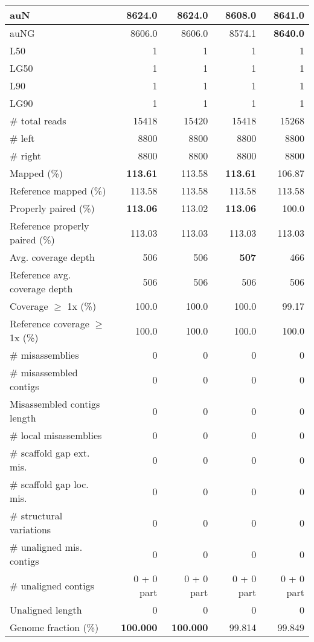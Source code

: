 \documentclass[12pt,a4paper]{article}
\begin{document}
\begin{table}[ht]
\begin{center}
\begin{tabular}{|l*{4}{|r}|}
auN & 8624.0 & 8624.0 & 8608.0 & {\bf 8641.0} \\ \hline
auNG & 8606.0 & 8606.0 & 8574.1 & {\bf 8640.0} \\ \hline
L50 & 1 & 1 & 1 & 1 \\ \hline
LG50 & 1 & 1 & 1 & 1 \\ \hline
L90 & 1 & 1 & 1 & 1 \\ \hline
LG90 & 1 & 1 & 1 & 1 \\ \hline
\# total reads & 15418 & 15420 & 15418 & 15268 \\ \hline
\# left & 8800 & 8800 & 8800 & 8800 \\ \hline
\# right & 8800 & 8800 & 8800 & 8800 \\ \hline
Mapped (\%) & {\bf 113.61} & 113.58 & {\bf 113.61} & 106.87 \\ \hline
Reference mapped (\%) & 113.58 & 113.58 & 113.58 & 113.58 \\ \hline
Properly paired (\%) & {\bf 113.06} & 113.02 & {\bf 113.06} & 100.0 \\ \hline
Reference properly paired (\%) & 113.03 & 113.03 & 113.03 & 113.03 \\ \hline
Avg. coverage depth & 506 & 506 & {\bf 507} & 466 \\ \hline
Reference avg. coverage depth & 506 & 506 & 506 & 506 \\ \hline
Coverage $\geq$ 1x (\%) & 100.0 & 100.0 & 100.0 & 99.17 \\ \hline
Reference coverage $\geq$ 1x (\%) & 100.0 & 100.0 & 100.0 & 100.0 \\ \hline
\# misassemblies & 0 & 0 & 0 & 0 \\ \hline
\# misassembled contigs & 0 & 0 & 0 & 0 \\ \hline
Misassembled contigs length & 0 & 0 & 0 & 0 \\ \hline
\# local misassemblies & 0 & 0 & 0 & 0 \\ \hline
\# scaffold gap ext. mis. & 0 & 0 & 0 & 0 \\ \hline
\# scaffold gap loc. mis. & 0 & 0 & 0 & 0 \\ \hline
\# structural variations & 0 & 0 & 0 & 0 \\ \hline
\# unaligned mis. contigs & 0 & 0 & 0 & 0 \\ \hline
\# unaligned contigs & 0 + 0 part & 0 + 0 part & 0 + 0 part & 0 + 0 part \\ \hline
Unaligned length & 0 & 0 & 0 & 0 \\ \hline
Genome fraction (\%) & {\bf 100.000} & {\bf 100.000} & 99.814 & 99.849 \\ \hline

\end{tabular}
\end{center}
\end{table}
\end{document}

